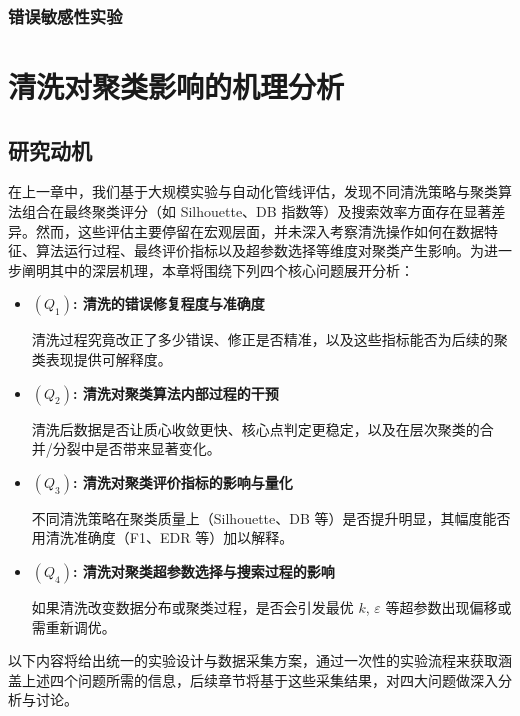 \documentclass[10pt]{article} %
\numberwithin{equation}{section}
\begin{document}
\subsubsection{错误敏感性实验}
\label{sec:error_sense_exp}

\section{清洗对聚类影响的机理分析}
\label{sec:chapter6}

\subsection{研究动机}
\label{sec:motivation}

在上一章中，我们基于大规模实验与自动化管线评估，发现不同清洗策略与聚类算法组合在最终聚类评分（如 Silhouette、DB 指数等）及搜索效率方面存在显著差异。然而，这些评估主要停留在宏观层面，并未深入考察清洗操作如何在数据特征、算法运行过程、最终评价指标以及超参数选择等维度对聚类产生影响。为进一步阐明其中的深层机理，本章将围绕下列四个核心问题展开分析：

\begin{itemize}
    \item \textbf{\((Q_1)\): 清洗的错误修复程度与准确度}
    
    清洗过程究竟改正了多少错误、修正是否精准，以及这些指标能否为后续的聚类表现提供可解释度。
    
    \item \textbf{\((Q_2)\): 清洗对聚类算法内部过程的干预}

    清洗后数据是否让质心收敛更快、核心点判定更稳定，以及在层次聚类的合并/分裂中是否带来显著变化。

    \item \textbf{\((Q_3)\): 清洗对聚类评价指标的影响与量化}

    不同清洗策略在聚类质量上（Silhouette、DB 等）是否提升明显，其幅度能否用清洗准确度（F1、EDR 等）加以解释。

    \item \textbf{\((Q_4)\): 清洗对聚类超参数选择与搜索过程的影响}

    如果清洗改变数据分布或聚类过程，是否会引发最优 $k$, $\varepsilon$ 等超参数出现偏移或需重新调优。
\end{itemize}

\noindent
以下内容将给出统一的实验设计与数据采集方案，通过一次性的实验流程来获取涵盖上述四个问题所需的信息，后续章节将基于这些采集结果，对四大问题做深入分析与讨论。
\end{document}
